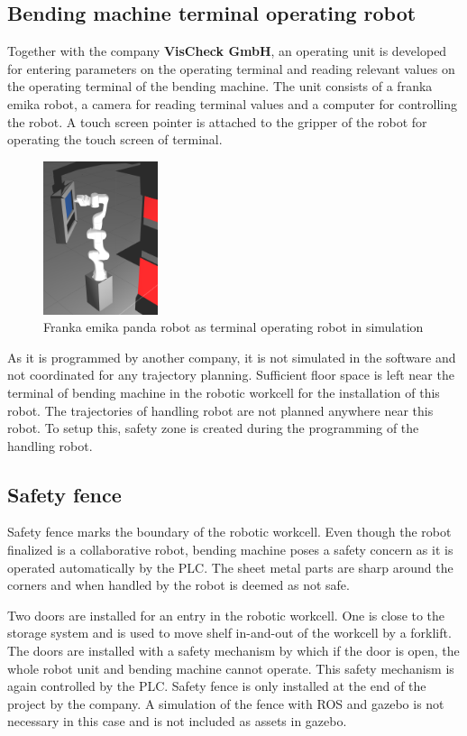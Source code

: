 \subsection{Bending machine terminal operating robot}
\label{sub:panda-robot}
    Together with the company \textbf{VisCheck GmbH}, an operating unit is developed
    for entering parameters on the operating terminal and reading relevant values on the operating
    terminal of the bending machine. The unit consists of a franka emika robot, a camera for reading terminal values
    and a computer for controlling the robot. A touch screen pointer is attached to the gripper of the robot
    for operating the touch screen of terminal.

    \begin{figure}[h]
        \centering
        \includegraphics[width=0.3\textwidth]{figures/panda-robot-simulation.png}
        \caption{Franka emika panda robot as terminal operating robot in simulation}
        \label{fig:terminal-robot}
    \end{figure}

    As it is programmed by another company, it is not simulated in the software and not coordinated for any trajectory planning. Sufficient floor space
    is left near the terminal of bending machine in the robotic workcell for the installation of this robot.
    The trajectories of handling robot are not planned anywhere near this robot. To setup this, safety zone is created
    during the programming of the handling robot.


\subsection{Safety fence}
\label{sub:safety-fence}
    Safety fence marks the boundary of the robotic workcell. Even though the robot finalized is a collaborative robot,
    bending machine poses a safety concern as it is operated automatically by the PLC. The sheet metal parts are sharp
    around the corners and when handled by the robot is deemed as not safe.

    Two doors are installed for an entry in the robotic workcell. One is close to the storage system and is used
    to move shelf in-and-out of the workcell by a forklift. The doors are installed with a safety mechanism by which
    if the door is open, the whole robot unit and bending machine cannot operate. This safety mechanism 
    is again controlled by the PLC. Safety fence is only installed at the end of the project by the company.
    A simulation of the fence with ROS and gazebo is not necessary in this case and is not included as assets in gazebo.





